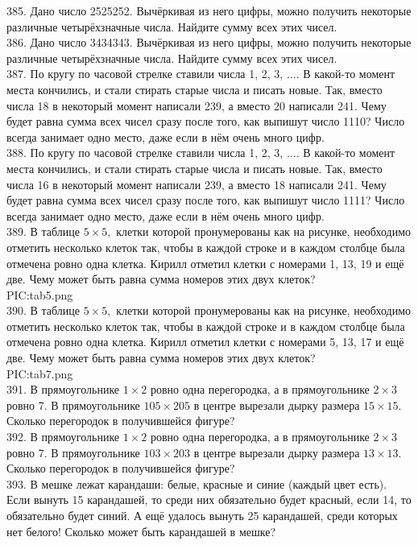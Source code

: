 385. Дано число 2525252. Вычёркивая из него цифры, можно получить некоторые различные четырёхзначные числа. Найдите сумму всех этих чисел.\\
386. Дано число 3434343. Вычёркивая из него цифры, можно получить некоторые различные четырёхзначные числа. Найдите сумму всех этих чисел.\\
387. По кругу по часовой стрелке ставили числа 1, 2, 3, $\ldots.$ В какой-то момент места кончились, и стали стирать старые числа и писать новые. Так, вместо числа 18 в некоторый момент написали 239, а вместо 20 написали 241. Чему будет равна сумма всех чисел сразу после того, как выпишут число 1110? Число всегда занимает одно место, даже если в нём очень много цифр.\\
388. По кругу по часовой стрелке ставили числа 1, 2, 3, $\ldots.$ В какой-то момент места кончились, и стали стирать старые числа и писать новые. Так, вместо числа 16 в некоторый момент написали 239, а вместо 18 написали 241. Чему будет равна сумма всех чисел сразу после того, как выпишут число 1111? Число всегда занимает одно место, даже если в нём очень много цифр.\\
389. В таблице $5\times5,$ клетки которой пронумерованы как на рисунке, необходимо отметить несколько клеток так, чтобы в каждой строке и в каждом столбце была отмечена ровно одна клетка. Кирилл отметил клетки с номерами 1, 13, 19 и ещё две. Чему может быть равна сумма номеров этих двух клеток?\\
{{PIC:tab5.png}}\\
390. В таблице $5\times5,$ клетки которой пронумерованы как на рисунке, необходимо отметить несколько клеток так, чтобы в каждой строке и в каждом столбце была отмечена ровно одна клетка. Кирилл отметил клетки с номерами 5, 13, 17 и ещё две. Чему может быть равна сумма номеров этих двух клеток?\\
{{PIC:tab7.png}}\\
391. В прямоугольнике $1\times2$ ровно одна перегородка, а в прямоугольнике $2\times3$ ровно 7. В прямоугольнике $105\times205$ в центре вырезали
дырку размера $15\times15.$ Сколько перегородок в получившейся фигуре?\\
392. В прямоугольнике $1\times2$ ровно одна перегородка, а в прямоугольнике $2\times3$ ровно 7. В прямоугольнике $103\times203$ в центре вырезали
дырку размера $13\times13.$ Сколько перегородок в получившейся фигуре?\\
393. В мешке лежат карандаши: белые, красные и синие (каждый цвет есть). Если вынуть 15 карандашей, то среди них обязательно будет красный, если 14, то обязательно будет синий. А ещё удалось вынуть 25 карандашей, среди которых нет белого! Сколько может быть карандашей в мешке?\\
